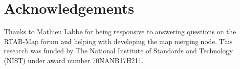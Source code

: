 \documentclass[letterpaper, 10 pt, conference]{ieeeconf}  %
\begin{document}
\section{Acknowledgements}
Thanks to Mathieu Labbe for being responsive to answering questions on the RTAB-Map forum and helping with developing the map merging node. This research was funded by The National Institute of Standards and Technology (NIST) under award number 70NANB17H211.


\end{document}
